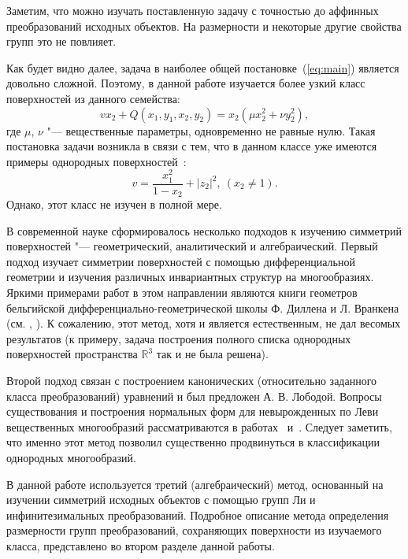 \documentclass[../main.tex]{subfiles}
\begin{document}
Заметим, что можно изучать поставленную задачу с точностью до аффинных преобразований исходных объектов. На размерности и некоторые другие свойства групп это не повлияет.

Как будет видно далее, задача в наиболее общей постановке~(\ref{eq:main}) является довольно сложной. Поэтому, в данной работе изучается более узкий класс поверхностей из данного семейства:
\begin{equation}\label{eq:initial}
v x_2 + Q(x_1, y_1, x_2, y_2) = x_2 (\mu x_2^2 + \nu y_2^2),
\end{equation}
где $\mu$, $\nu$ "--- вещественные параметры, одновременно не равные нулю. Такая постановка задачи возникла в связи с тем, что в данном классе уже имеются примеры однородных поверхностей~\cite{ALS}:
\begin{equation}\label{eq:homogenous}
v = \frac{x_1^2}{1 - x_2} + |z_2|^2,\ (x_2 \ne 1).
\end{equation}
Однако, этот класс не изучен в полной мере.

В современной науке сформировалось несколько подходов к изучению симметрий поверхностей "--- геометрический, аналитический и алгебраический. Первый подход изучает симметрии поверхностей с помощью дифференциальной геометрии и изучения различных инвариантных структур на многообразиях. Яркими примерами работ в этом направлении являются книги геометров бельгийской дифференциально-геометрической школы Ф. Диллена и Л. Вранкена (см. \cite{dillen}, \cite{vrancken}). К сожалению, этот метод, хотя и является естественным, не дал весомых результатов (к примеру, задача построения полного списка однородных поверхностей пространства $\mathbb{R}^3$ так и не была решена).

Второй подход связан с построением канонических (относительно заданного класса преобразований) уравнений и был предложен А. В. Лободой. Вопросы существования и построения нормальных форм для невырожденных по Леви вещественных многообразий рассматриваются в работах~\cite{loboda_hodarev} и~\cite{danilov}. Следует заметить, что именно этот метод позволил существенно продвинуться в классификации однородных многообразий.

В данной работе используется третий (алгебраический) метод, основанный на изучении симметрий исходных объектов с помощью групп Ли и инфинитезимальных преобразований. Подробное описание метода определения размерности групп преобразований, сохраняющих поверхности из изучаемого класса, представлено во втором разделе данной работы.
\end{document}
